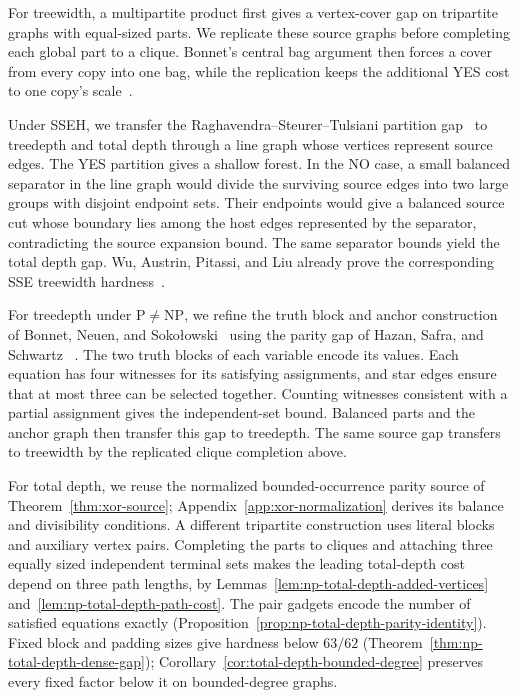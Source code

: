 For treewidth, a multipartite product first gives a vertex-cover gap on
tripartite graphs with equal-sized parts. We replicate these source graphs before
completing each global part to a clique. Bonnet's central bag argument
then forces a cover from every copy into one bag, while the replication
keeps the additional YES cost to one copy's scale~\cite[Lemma~6]{BonnetTreewidth}.

Under SSEH, we transfer the Raghavendra--Steurer--Tulsiani partition
gap~\cite{RST} to treedepth and total depth through a line graph whose
vertices represent source edges. The YES partition gives a shallow forest.
In the NO case, a small balanced separator in the line graph would divide
the surviving source edges into two large groups with disjoint endpoint
sets. Their endpoints would give a balanced source cut whose boundary
lies among the host edges represented by the separator, contradicting
the source expansion bound. The same separator bounds yield the total
depth gap. Wu, Austrin, Pitassi, and Liu already prove the corresponding
SSE treewidth hardness~\cite[Theorem~1.1]{APW}.

For treedepth under $\mathrm{P}\ne\mathrm{NP}$, we refine the truth block
and anchor construction of Bonnet, Neuen, and Soko\l owski~\cite{BNS}
using the parity gap of Hazan, Safra, and Schwartz
~\cite[Theorem~10]{HazanSafraSchwartz2003}. The two truth blocks of each
variable encode its values. Each equation has four witnesses for its
satisfying assignments, and star edges ensure that at most three can be
selected together. Counting witnesses consistent with a partial
assignment gives the independent-set bound. Balanced parts and the anchor
graph then transfer this gap to treedepth. The same source gap transfers to treewidth by the
replicated clique completion above.

For total depth, we reuse the normalized bounded-occurrence parity source
of Theorem~\ref{thm:xor-source}; Appendix~\ref{app:xor-normalization}
derives its balance and divisibility conditions. A different tripartite
construction uses literal blocks and auxiliary vertex pairs. Completing
the parts to cliques and attaching three equally sized independent
terminal sets makes the leading total-depth cost depend on three path
lengths, by Lemmas~\ref{lem:np-total-depth-added-vertices}
and~\ref{lem:np-total-depth-path-cost}. The pair gadgets encode the number
of satisfied equations exactly
(Proposition~\ref{prop:np-total-depth-parity-identity}). Fixed block and
padding sizes give hardness below $63/62$
(Theorem~\ref{thm:np-total-depth-dense-gap});
Corollary~\ref{cor:total-depth-bounded-degree} preserves every fixed factor
below it on bounded-degree graphs.

